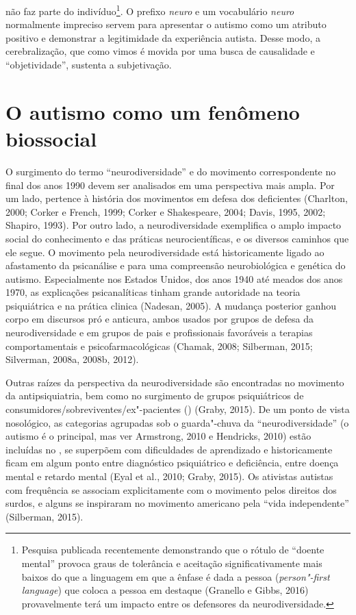 não faz parte do indivíduo\footnote[9]{Pesquisa publicada recentemente demonstrando que o rótulo de
``doente mental'' provoca graus de tolerância e aceitação
significativamente mais baixos do que a linguagem em que a ênfase é dada
a pessoa (\emph{person"-first language}) que coloca a pessoa em destaque
(Granello e Gibbs, 2016) provavelmente terá um impacto entre os
defensores da neurodiversidade.}. O prefixo \emph{neuro} e
um vocabulário \emph{neuro} normalmente impreciso servem para apresentar
o autismo como um atributo positivo e demonstrar a legitimidade da
experiência autista. Desse modo, a cerebralização, que como vimos é
movida por uma busca de causalidade e ``objetividade'', sustenta a
subjetivação.

\chapter{O autismo como um fenômeno biossocial}

O surgimento do termo ``neurodiversidade'' e do movimento correspondente
no final dos anos 1990 devem ser analisados em uma perspectiva mais
ampla. Por um lado, pertence à história dos movimentos em defesa dos
deficientes (Charlton, 2000; Corker e French, 1999; Corker e
Shakespeare, 2004; Davis, 1995, 2002; Shapiro, 1993). Por outro lado, a
neurodiversidade exemplifica o amplo impacto social do conhecimento e
das práticas neurocientíficas, e os diversos caminhos que ele segue. O
movimento pela neurodiversidade está historicamente ligado ao
afastamento da psicanálise e para uma compreensão neurobiológica e
genética do autismo. Especialmente nos Estados Unidos, dos anos 1940 até
meados dos anos 1970, as explicações psicanalíticas tinham grande
autoridade na teoria psiquiátrica e na prática clinica (Nadesan, 2005).
A mudança posterior ganhou corpo em discursos pró e anticura, ambos
usados por grupos de defesa da neurodiversidade e em grupos de pais e
profissionais favoráveis a terapias comportamentais e
psicofarmacológicas (Chamak, 2008; Silberman, 2015; Silverman, 2008a,
2008b, 2012).

Outras raízes da perspectiva da neurodiversidade são encontradas no
movimento da antipsiquiatria, bem como no surgimento de grupos
psiquiátricos de consumidores/sobreviventes/ex"-pacientes () (Graby,
2015). De um ponto de vista nosológico, as categorias agrupadas sob o
guarda"-chuva da ``neurodiversidade'' (o autismo é o principal, mas ver
Armstrong, 2010 e Hendricks, 2010) estão incluídas no \emph{}, se
superpõem com dificuldades de aprendizado e historicamente ficam em
algum ponto entre diagnóstico psiquiátrico e deficiência, entre doença
mental e retardo mental (Eyal et al., 2010; Graby, 2015). Os ativistas
autistas com frequência se associam explicitamente com o movimento pelos
direitos dos surdos, e alguns se inspiraram no movimento americano pela
``vida independente'' (Silberman, 2015).

